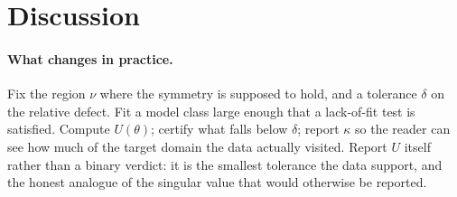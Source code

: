 \section{Discussion}

\paragraph{What changes in practice.} Fix the region $\nu$ where the symmetry
is supposed to hold, and a tolerance $\delta$ on the relative defect. Fit a
model class large enough that a lack-of-fit test is satisfied. Compute
$U(\theta)$; certify what falls below $\delta$; report $\kappa$ so the reader
can see how much of the target domain the data actually visited. Report $U$
itself rather than a binary verdict: it is the smallest tolerance the data
support, and the honest analogue of the singular value that would otherwise be
reported.

